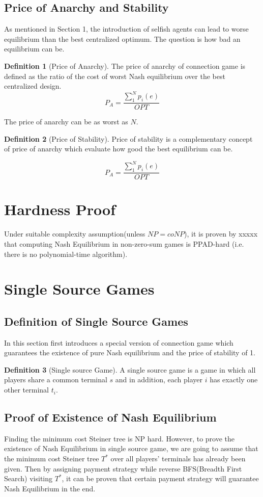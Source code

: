 \documentclass[11pt,psfig,times]{article}
\theoremstyle{theorem}
\theoremstyle{definition}
\newtheorem{definition}{Definition}[section]
\begin{document}
\subsection{Price of Anarchy and Stability}
As mentioned in Section 1, the introduction of selfish agents can lead to worse equilibrium than the best centralized optimum. The question is how bad an equilibrium can be.
\begin{definition}[Price of Anarchy] The price of anarchy of connection game is defined as the ratio of the cost of worst Nash equilibrium over the best centralized design.
	\[P_A = \dfrac{\sum_{1}^{N}p_i(e) }{OPT}\]
\end{definition}

The price of anarchy can be as worst as \(N\).

\begin{definition}[Price of Stability] Price of stability is a complementary concept of price of anarchy which evaluate how good the best equilibrium can be. 

\[P_A = \dfrac{\sum_{1}^{N}p_i(e) }{OPT}\]
\end{definition}


\section{Hardness Proof}	
Under suitable complexity assumption(unless \(NP = coNP\)), it is proven by xxxxx that computing Nash Equilibrium in non-zero-sum games is PPAD-hard (i.e. there is no polynomial-time algorithm).


\section{Single Source Games}
\subsection{Definition of Single Source Games}
In this section first introduces a special version of connection game which guarantees the existence of pure Nash equilibrium and the price of stability of 1. 
\begin{definition}[Single source Game]
	A single source game is a game in which all players share a common terminal \(s\) and in addition, each player \(i\) has exactly one other terminal \(t_i\).
\end{definition}

\subsection{Proof of Existence of Nash Equilibrium}
Finding the minimum cost Steiner tree is NP hard. However, to prove the existence of Nash Equilibrium in single source game, we are going to assume that the minimum cost Steiner tree \(T^*\) over all players' terminals has already been given. Then by assigning payment strategy while reverse BFS(Breadth First Search) visiting \(T^*\), it can be proven that certain payment strategy will guarantee Nash Equilibrium in the end. 
\end{document}
